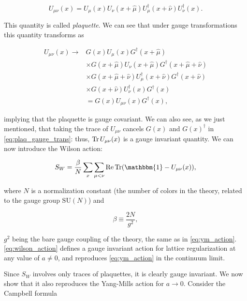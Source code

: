 \documentclass[reqno,12pt]{article}
\numberwithin{equation}{section}
\newcommand{\SU}{\mathrm{SU}}
\newcommand{\id}{\mathbbm{1}}
\begin{document}
\begin{equation} \label{eq:plaquette}
	U_{\mu\nu}(x) = U_\mu(x) U_\nu(x + \hat{\mu}) U_\mu^\dagger(x + \hat{\nu}) U_\nu^\dagger(x).
\end{equation}

This quantity is called \textit{plaquette}. We can see that under gauge transformations this quantity transforms as

\begin{equation} \label{eq:plaq_gauge_trans}
	\begin{aligned}
		U_{\mu\nu}(x) \rightarrow &G(x) U_\mu(x) G^\dagger(x + \hat{\mu}) \\ 
			&\times G(x + \hat{\mu}) U_\nu(x + \hat{\mu}) G^\dagger(x + \hat{\mu} + \hat{\nu})  \\
			&\times G(x + \hat{\mu} + \hat{\nu}) U_\mu^\dagger(x + \hat{\nu}) G^\dagger(x + \hat{\nu})  \\
			&\times G(x + \hat{\nu}) U_\nu^\dagger(x) G^\dagger(x) \\
			&= G(x) U_{\mu\nu}(x) G^\dagger(x),
	\end{aligned}	
\end{equation}

implying that the plaquette is gauge covariant. We can also see, as we just mentioned, that taking the trace of $U_{\mu\nu}$
cancels $G(x)$ and $G(x)^\dagger$ in \eqref{eq:plaq_gauge_trans}: thus, $\Tr U_{\mu\nu}(x)$ is a gauge invariant quantity.
We can now introduce the Wilson action:

\begin{equation} \label{eq:wilson_action}
	S_W = \frac{\beta}{N} \sum_x \sum_{\mu<\nu} \Re \Tr(\id - U_{\mu\nu}(x)),
\end{equation}

where $N$ is a normalization constant (the number of colors in the theory, related to the gauge group $\SU(N)$) and

\begin{equation} \label{eq:beta}
	\beta \equiv \frac{2N}{g^2},
\end{equation}

$g^2$ being the bare gauge coupling of the theory, the same as in \eqref{eq:ym_action}. \eqref{eq:wilson_action} defines
a gauge invariant action for lattice regularization at any value of $a \ne 0$, and reproduces \eqref{eq:ym_action} in the 
continuum limit.

Since $S_W$ involves only traces of plaquettes, it is clearly gauge invariant. We now show that it also reproduces the
Yang-Mills action for $a \rightarrow 0$. Consider the Campbell formula
\end{document}
